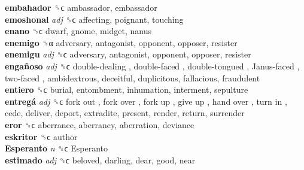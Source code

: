 \textbf{embahador} ␝ϲ  ambassador, embassador  \\
\textbf{emoshonal} \emph{adj}  ␝ϲ  affecting, poignant, touching  \\
\textbf{enano} ␝ϲ  dwarf, gnome, midget, nanus  \\
\textbf{enemigo} ␝α  adversary, antagonist, opponent, opposer, resister  \\
\textbf{enemigu} \emph{adj}  ␝ϲ  adversary, antagonist, opponent, opposer, resister  \\
\textbf{engañoso} \emph{adj}  ␝ϲ   double-dealing ,  double-faced ,  double-tongued ,  Janus-faced ,  two-faced , ambidextrous, deceitful, duplicitous, fallacious, fraudulent  \\
\textbf{entiero} ␝ϲ  burial, entombment, inhumation, interment, sepulture  \\
\textbf{entregá} \emph{adj}  ␝ϲ   fork out ,  fork over ,  fork up ,  give up ,  hand over ,  turn in , cede, deliver, deport, extradite, present, render, return, surrender  \\
\textbf{eror} ␝ϲ  aberrance, aberrancy, aberration, deviance  \\
\textbf{eskritor} ␝ϲ  author  \\
\textbf{Esperanto} \emph{n}  ␝ϲ   Esperanto   \\
\textbf{estimado} \emph{adj}  ␝ϲ  beloved, darling, dear, good, near  \\
